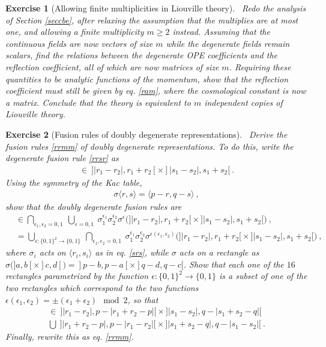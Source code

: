 \documentclass[12pt,a4paper,notitlepage]{report}
\numberwithin{equation}{section}
\theoremstyle{break}
\newtheorem{exo}{Exercise}[chapter]
\begin{document}
\begin{exo}[Allowing finite multiplicities in Liouville theory]
 ~\label{exomul}
Redo the analysis of Section \ref{seccbe}, after relaxing the assumption that the multiplies are at most one, and allowing a finite multiplicity $m\geq 2$ instead. 
Assuming that the continuous fields are now vectors of size $m$ while the degenerate fields remain scalars, find the relations between the degenerate OPE coefficients and the reflection coefficient, all of which are now matrices of size $m$. 
Requiring these quantities to be analytic functions of the momentum, show that the reflection coefficient must still be given by eq. \eqref{ram}, where the cosmological constant is now a matrix. 
Conclude that the theory is equivalent to $m$ independent copies of Liouville theory. 
\end{exo}


\begin{exo}[Fusion rules of doubly degenerate representations]
 ~\label{exofus}
Derive the fusion rules \eqref{rrmm} of doubly degenerate representations.
To do this, write the degenerate fusion rule \eqref{rrsr} as 
\begin{align}
[r_3,s_3]\in\ ]|r_1-r_2|,r_1+r_2[ \times ]|s_1-s_2|,s_1+s_2[ \ .
\end{align}
Using the symmetry of the Kac table,
\begin{align}
 \sigma\langle r,s \rangle = \langle p-r,q-s\rangle\ ,
\label{srs}
\end{align}
show that the doubly degenerate fusion rules are
\begin{align}
[r_3,s_3]& \in \bigcap_{\epsilon_1,\epsilon_2 = 0,1}\ \bigcup_{\epsilon=0,1} \ \sigma_1^{\epsilon_1} \sigma_2^{\epsilon_2} \sigma^{\epsilon}
\Big( \big]|r_1-r_2|,r_1+r_2\big[ \times \big]|s_1-s_2|,s_1+s_2\big[  \Big)\ ,
\\
& = \bigcup_{\epsilon:\{0,1\}^2 \rightarrow \{0,1\} }\ \bigcap_{\epsilon_1,\epsilon_2=0,1} \ \sigma_1^{\epsilon_1} \sigma_2^{\epsilon_2} \sigma^{\epsilon(\epsilon_1,\epsilon_2)} \Big( \big]|r_1-r_2|,r_1+r_2\big[ \times \big]|s_1-s_2|,s_1+s_2\big[  \Big)\ ,
\end{align}
where $\sigma_i$ acts on $\langle r_i,s_i\rangle$ as in eq. \eqref{srs}, while $\sigma$ acts on a rectangle as $\sigma\big(]a,b[\times]c,d[\big) = ]p-b,p-a[\times ]q-d,q-c[$.
Show that each one of the $16$ rectangles parametrized by the function $\epsilon:\{0,1\}^2 \rightarrow \{0,1\} $ is a subset of one of the two rectangles which correspond to the two functions $\epsilon(\epsilon_1,\epsilon_2)=\pm (\epsilon_1+\epsilon_2) \mod 2$, so that 
\begin{multline}
 [r_3,s_3]  \in\  \big]|r_1-r_2|,p-|r_1+r_2-p|\big[\times \big]|s_1-s_2|,q-|s_1+s_2-q|\big[ 
\\
 \bigcup\ \big]|r_1+r_2-p|,p-|r_1-r_2|\big[\times \big]|s_1+s_2-q|,q-|s_1-s_2|\big[\ .
\end{multline}
Finally, rewrite this as eq. \eqref{rrmm}.
\end{exo}
\end{document}
